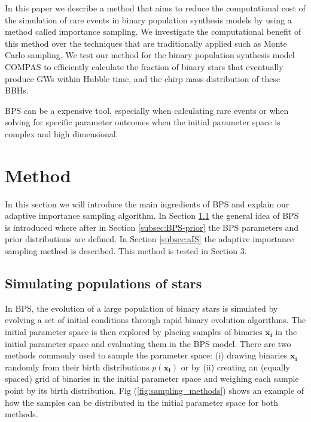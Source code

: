 \documentclass[a4paper,fleqn,usenatbib]{mnras}
\begin{document}
In this paper we describe a method that aims to reduce the computational cost of the simulation of rare events in binary population synthesis models by using a method called importance sampling.  We investigate the computational benefit of this method over the techniques that are traditionally applied such as Monte Carlo sampling. We test our method for the binary population synthesis model COMPAS to efficiently calculate the fraction of binary stars that eventually produce GWs within Hubble time, and the chirp mass distribution of these BBHs. 


BPS can be a expensive tool, especially when calculating rare events or when solving for specific parameter outcomes when the initial parameter space is complex and high dimensional. 



\section{Method}
In this section we will introduce the main ingredients of BPS and explain our adaptive importance sampling algorithm. In Section \ref{subsec:BPS} the general idea of BPS is introduced where after in Section \ref{subsec:BPS-prior} the BPS parameters and prior distributions are defined. In Section \ref{subsec:aIS} the adaptive importance sampling method is described. 
%
This method is tested in Section 3.    

\subsection{Simulating populations of stars}
\label{subsec:BPS}
In BPS, the evolution of a large population of binary stars is simulated by evolving a set of initial conditions  through rapid binary evolution algorithms. The initial parameter space is then explored by placing samples of binaries $\mathbf{x_i}$ in the initial parameter space and evaluating them in the BPS model. There are two methods commonly used to sample the parameter space: (i) drawing binaries $\mathbf{x_i}$ randomly from their birth distributions $p(\mathbf{x_i})$ or by (ii)  creating an (equally spaced) grid of binaries in the initial parameter space and weighing each sample point by its birth distribution. Fig (\ref{fig:sampling_methods}) shows an example of how the samples can be distributed in the initial parameter space for both methods. 
\end{document}
